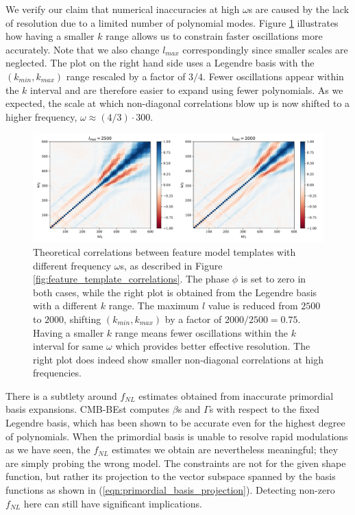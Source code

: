 We verify our claim that numerical inaccuracies at high $\omega$s are caused by the lack of resolution due to a limited number of polynomial modes. Figure \ref{fig:feature_template_correlations_compare_lmax} illustrates how having a smaller $k$ range allows us to constrain faster oscillations more accurately. Note that we also change $l_{max}$ correspondingly since smaller scales are neglected. The plot on the right hand side uses a Legendre basis with the $(k_{min}, k_{max})$ range rescaled by a factor of $3/4$. Fewer oscillations appear within the $k$ interval and are therefore easier to expand using fewer polynomials. As we expected, the scale at which non-diagonal correlations blow up is now shifted to a higher frequency, $\omega \approx (4/3) \cdot 300$. 

\begin{figure}[htbp!] 
	\centering    
	\includegraphics[width=\textwidth]{sine_template_correlations_compare_lmax_new.pdf}
	\caption{Theoretical correlations between feature model templates with different frequency $\omega$s, as described in Figure \ref{fig:feature_template_correlations}. The phase $\phi$ is set to zero in both cases, while the right plot is obtained from the Legendre basis with a different $k$ range. The maximum $l$ value is reduced from $2500$ to $2000$, shifting $(k_{min},k_{max})$ by a factor of $2000/2500 = 0.75$. Having a smaller $k$ range means fewer oscillations within the $k$ interval for same $\omega$ which provides better effective resolution. The right plot does indeed show smaller non-diagonal correlations at high frequencies.}
	\label{fig:feature_template_correlations_compare_lmax}
\end{figure}

There is a subtlety around $f_{NL}$ estimates obtained from inaccurate primordial basis expansions. CMB-BEst computes $\beta$s and $\Gamma$s with respect to the fixed Legendre basis, which has been shown to be accurate even for the highest degree of polynomials. When the primordial basis is unable to resolve rapid modulations as we have seen, the $f_{NL}$ estimates we obtain are nevertheless meaningful; they are simply probing the wrong model. The constraints are not for the given shape function, but rather its projection to the vector subspace spanned by the basis functions as shown in (\ref{eqn:primordial_basis_projection}). Detecting non-zero $f_{NL}$ here can still have significant implications.

